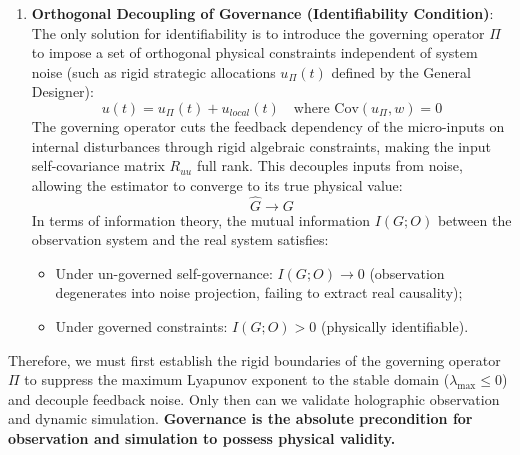 \documentclass[11pt,a4paper]{article}
\begin{document}
\begin{enumerate}
    \item \textbf{Orthogonal Decoupling of Governance (Identifiability Condition)}:
    The only solution for identifiability is to introduce the governing operator $\Pi$ to impose a set of orthogonal physical constraints independent of system noise (such as rigid strategic allocations $u_{\Pi}(t)$ defined by the General Designer):
    \begin{equation}
        u(t) = u_{\Pi}(t) + u_{local}(t) \quad \text{where } \text{Cov}(u_{\Pi}, w) = 0
    \end{equation}
    The governing operator cuts the feedback dependency of the micro-inputs on internal disturbances through rigid algebraic constraints, making the input self-covariance matrix $R_{uu}$ full rank. This decouples inputs from noise, allowing the estimator to converge to its true physical value:
    \begin{equation}
        \hat{G} \longrightarrow G
    \end{equation}
    In terms of information theory, the mutual information $I(G; O)$ between the observation system and the real system satisfies:
    \begin{itemize}
        \item Under un-governed self-governance: $I(G; O) \to 0$ (observation degenerates into noise projection, failing to extract real causality);
        \item Under governed constraints: $I(G; O) > 0$ (physically identifiable).
    \end{itemize}
\end{enumerate}
Therefore, we must first establish the rigid boundaries of the governing operator $\Pi$ to suppress the maximum Lyapunov exponent to the stable domain ($\lambda_{\text{max}} \le 0$) and decouple feedback noise. Only then can we validate holographic observation and dynamic simulation. \textbf{Governance is the absolute precondition for observation and simulation to possess physical validity.}
\end{document}
